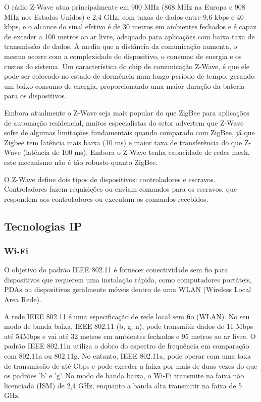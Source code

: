 O rádio Z-Wave atua principalmente em 900 MHz (868 MHz na Europa e
908 MHz nos Estados Unidos) e 2,4 GHz, com taxas de dados entre 9,6
kbps e 40 kbps, e o alcance do sinal efetivo é de 30 metros em ambientes
fechados e é capaz de exceder a 100 metros ao ar livre, adequado para
aplicações com baixa taxa de transmissão de dados. À media que a distância
da comunicação aumenta, o mesmo ocorre com a complexidade do dispositivo,
o consumo de energia e os custos do sistema. Um característica do
chip de comunicação Z-Wave, é que ele pode ser colocado no estado
de dormência num longo período de tempo, gerando um baixo consumo
de energia, proporcionando uma maior duração da bateria para os dispositivos.

Embora atualmente o Z-Wave seja mais popular do que ZigBee para aplicações
de automação residencial, muitos especialistas do setor advertem
que Z-Wave sofre de algumas limitações fundamentais quando comparado
com ZigBee, já que Zigbee tem latência mais baixa (10 ms) e maior
taxa de transferência do que Z-Wave (latência de 100 ms). Embora o
Z-Wave tenha capacidade de redes mesh, este mecanismo não é tão robusto
quanto ZigBee. 

O Z-Wave define dois tipos de dispositivos: controladores e escravos.
Controladores fazem requisições ou enviam comandos para os escravos,
que respondem aos controladores ou executam os comandos recebidos.

\subsection{Tecnologias IP}

\subsubsection{Wi-Fi }

O objetivo do padrão IEEE 802.11\cite{ieee1997wireless} é fornecer
conectividade sem fio para dispositivos que requerem uma instalação
rápida, como computadores portáteis, PDAs ou dispositivos geralmente
móveis dentro de uma WLAN (Wireless Local Area Rede).

A rede IEEE 802.11 é uma especificação de rede local sem fio (WLAN).
No seu modo de banda baixa, IEEE 802.11 (b, g, n), pode transmitir
dados de 11 Mbps até 54Mbps e vai até 32 metros em ambientes fechados
e 95 metros ao ar livre\cite{Garroppo2011}. O padrão IEEE 802.11n
utiliza o dobro do espectro de frequência em comparação com 802.11a
ou 802.11g. No entanto, IEEE 802.11a, pode operar com uma taxa de
transmissão de até Gbps e pode exceder a faixa por mais de duas vezes
do que os padrões 'b' e 'g'. No modo de banda baixa, o Wi-Fi transmite
na faixa não licenciada (ISM) de 2,4 GHz, enquanto a banda alta transmitir
na faixa de 5 GHz.


